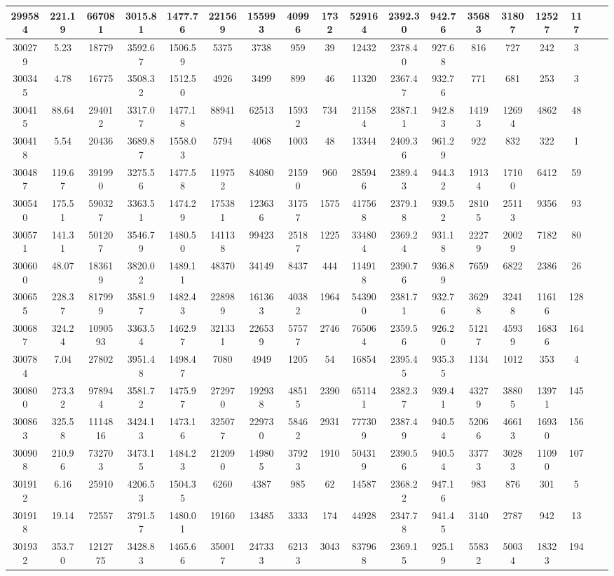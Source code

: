 \documentclass[10pt]{extarticle}
\begin{document}
\begin{longtable}{|c|c|c|c|c|c|c|c|c|c|c|c|c|c|c|c|c|c|}
\hline 
299584&221.19&667081&3015.81&1477.76&221569&155993&40996&1732&529164&2392.30&942.76&35683&31807&12527&117 \\ 
\hline 
300279&5.23&18779&3592.67&1506.59&5375&3738&959&39&12432&2378.40&927.68&816&727&242&3 \\ 
\hline 
300345&4.78&16775&3508.32&1512.50&4926&3499&899&46&11320&2367.47&932.76&771&681&253&3 \\ 
\hline 
300415&88.64&294012&3317.07&1477.18&88941&62513&15932&734&211584&2387.11&942.83&14193&12694&4862&48 \\ 
\hline 
300418&5.54&20436&3689.87&1558.03&5794&4068&1003&48&13344&2409.36&961.29&922&832&322&1 \\ 
\hline 
300487&119.67&391990&3275.56&1477.58&119752&84080&21590&960&285946&2389.43&944.32&19134&17100&6412&59 \\ 
\hline 
300540&175.51&590327&3363.51&1474.29&175381&123636&31757&1575&417568&2379.18&939.52&28105&25113&9356&93 \\ 
\hline 
300571&141.31&501207&3546.79&1480.50&141138&99423&25187&1225&334804&2369.24&931.18&22279&20029&7182&80 \\ 
\hline 
300600&48.07&183619&3820.02&1489.11&48370&34149&8437&444&114918&2390.76&936.89&7659&6822&2386&26 \\ 
\hline 
300655&228.37&817999&3581.97&1482.43&228989&161363&40382&1964&543900&2381.71&932.76&36298&32418&11616&128 \\ 
\hline 
300687&324.24&1090593&3363.54&1462.97&321331&226539&57577&2746&765064&2359.56&926.20&51217&45939&16836&164 \\ 
\hline 
300784&7.04&27802&3951.48&1498.47&7080&4949&1205&54&16854&2395.45&935.35&1134&1012&353&4 \\ 
\hline 
300800&273.32&978944&3581.72&1475.97&272970&192938&48515&2390&651141&2382.37&939.41&43279&38805&13971&145 \\ 
\hline 
300863&325.58&1114816&3424.13&1473.16&325077&229730&58462&2931&777309&2387.49&940.54&52066&46613&16930&156 \\ 
\hline 
300908&210.96&732703&3473.15&1484.23&212090&149805&37923&1910&504319&2390.56&940.54&33773&30283&11090&107 \\ 
\hline 
301912&6.16&25910&4206.53&1504.35&6260&4387&985&62&14587&2368.22&947.16&983&876&301&5 \\ 
\hline 
301918&19.14&72557&3791.57&1480.01&19160&13485&3333&174&44928&2347.78&941.45&3140&2787&942&13 \\ 
\hline 
301932&353.70&1212775&3428.83&1465.66&350017&247333&62133&3043&837968&2369.15&925.19&55832&50034&18323&194 \\ 

\end{longtable}
\end{document}
